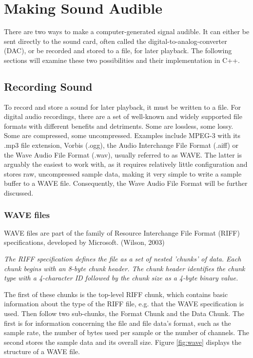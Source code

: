 \chapter{Making Sound Audible}

There are two ways to make a computer-generated signal audible. It can either be sent directly to the sound card, often called the digital-to-analog-converter (DAC), or be recorded and stored to a file, for later playback. The following sections will examine these two possibilities and their implementation in C++.

\section{Recording Sound}

To record and store a sound for later playback, it must be written to a file. For digital audio recordings, there are a set of well-known and widely supported file formats with different benefits and detriments. Some are lossless, some lossy. Some are compressed, some uncompressed. Examples include MPEG-3 with its .mp3 file extension, Vorbis (.ogg), the Audio Interchange File Format (.aiff) or the Wave Audio File Format (.wav), usually referred to as WAVE. The latter is arguably the easiest to work with, as it requires relatively little configuration and stores raw, uncompressed sample data, making it very simple to write a sample buffer to a WAVE file. Consequently, the Wave Audio File Format will be further discussed.

\subsection{WAVE files}

\noindent WAVE files are part of the family of Resource Interchange File Format (RIFF) specifications, developed by Microsoft. (Wilson, 2003)

\begin{blockquote}
  \emph{The RIFF specification defines the file as a set of nested 'chunks' of data. Each chunk begins with an 8-byte chunk header. The chunk header identifies the chunk type with a 4-character ID followed by the chunk size as a 4-byte binary value.} 
\end{blockquote}

\noindent The first of these chunks is the top-level RIFF chunk, which contains basic information about the type of the RIFF file, e.g. that the WAVE specification is used. Then follow two sub-chunks, the Format Chunk and the Data Chunk. The first is for information concerning the file and file data's format, such as the sample rate, the number of bytes used per sample or the number of channels. The second stores the sample data and its overall size. Figure \ref{fig:wave} displays the structure of a WAVE file.

